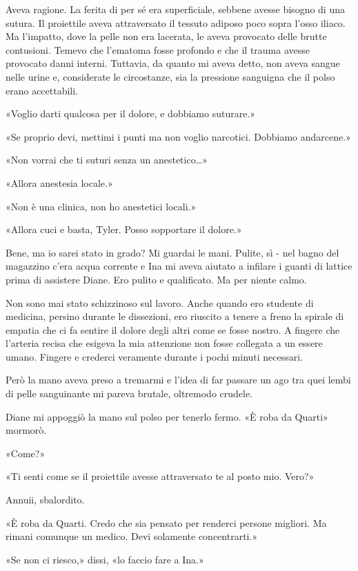 Aveva ragione. La ferita di per sé era superficiale, sebbene avesse
bisogno di una sutura. Il proiettile aveva attraversato il tessuto
adiposo poco sopra l'osso iliaco. Ma l'impatto, dove la pelle non era
lacerata, le aveva provocato delle brutte contusioni. Temevo che
l'ematoma fosse profondo e che il trauma avesse provocato danni interni.
Tuttavia, da quanto mi aveva detto, non aveva sangue nelle urine e,
considerate le circostanze, sia la pressione sanguigna che il polso
erano accettabili.

«Voglio darti qualcosa per il dolore, e dobbiamo suturare.»

«Se proprio devi, mettimi i punti ma non voglio narcotici. Dobbiamo
andarcene.»

«Non vorrai che ti suturi senza un anestetico\ldots»

«Allora anestesia locale.»

«Non è una clinica, non ho anestetici locali.»

«Allora cuci e basta, Tyler. Posso sopportare il dolore.»

Bene, ma io sarei stato in grado? Mi guardai le mani. Pulite, sì - nel
bagno del magazzino c'era acqua corrente e Ina mi aveva aiutato a
infilare i guanti di lattice prima di assistere Diane. Ero pulito e
qualificato. Ma per niente calmo.

Non sono mai stato schizzinoso sul lavoro. Anche quando ero studente di
medicina, persino durante le dissezioni, ero riuscito a tenere a freno
la spirale di empatia che ci fa sentire il dolore degli altri come se
fosse nostro. A fingere che l'arteria recisa che esigeva la mia
attenzione non fosse collegata a un essere umano. Fingere e crederci
veramente durante i pochi minuti necessari.

Però la mano aveva preso a tremarmi e l'idea di far passare un ago tra
quei lembi di pelle sanguinante mi pareva brutale, oltremodo crudele.

Diane mi appoggiò la mano sul polso per tenerlo fermo. «È roba da
Quarti» mormorò.

«Come?»

«Ti senti come se il proiettile avesse attraversato te al posto mio.
Vero?»

Annuii, sbalordito.

«È roba da Quarti. Credo che sia pensato per renderci persone migliori.
Ma rimani comunque un medico. Devi solamente concentrarti.»

«Se non ci riesco,» dissi, «lo faccio fare a Ina.»

